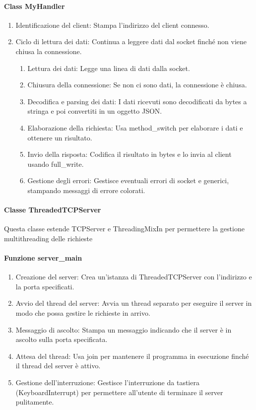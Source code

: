 \documentclass{article}
\begin{document}
\paragraph{Class MyHandler}
\begin{enumerate}
    \item Identificazione del client: Stampa l'indirizzo del client connesso.
    \item Ciclo di lettura dei dati: Continua a leggere dati dal socket finché non viene chiusa la connessione.
    \begin{enumerate}
        \item Lettura dei dati: Legge una linea di dati dalla socket.
        \item Chiusura della connessione: Se non ci sono dati, la connessione è chiusa.
        \item Decodifica e parsing dei dati: I dati ricevuti sono decodificati da bytes a stringa e poi convertiti in un oggetto JSON.
        \item Elaborazione della richiesta: Usa method\_switch per elaborare i dati e ottenere un risultato.
        \item Invio della risposta: Codifica il risultato in bytes e lo invia al client usando full\_write.
        \item Gestione degli errori: Gestisce eventuali errori di socket e generici, stampando messaggi di errore colorati.
    \end{enumerate}
\end{enumerate}

\paragraph{Classe ThreadedTCPServer}
Questa classe estende TCPServer e ThreadingMixIn per permettere la gestione multithreading delle richieste

\paragraph{Funzione server\_main}

\begin{enumerate}
    \item Creazione del server: Crea un'istanza di ThreadedTCPServer con l'indirizzo e la porta specificati.
    \item Avvio del thread del server: Avvia un thread separato per eseguire il server in modo che possa gestire le richieste in arrivo.
    \item Messaggio di ascolto: Stampa un messaggio indicando che il server è in ascolto sulla porta specificata.
    \item Attesa del thread: Usa join per mantenere il programma in esecuzione finché il thread del server è attivo.
    \item Gestione dell'interruzione: Gestisce l'interruzione da tastiera (KeyboardInterrupt) per permettere all'utente di terminare il server pulitamente.
\end{enumerate}
\end{document}
